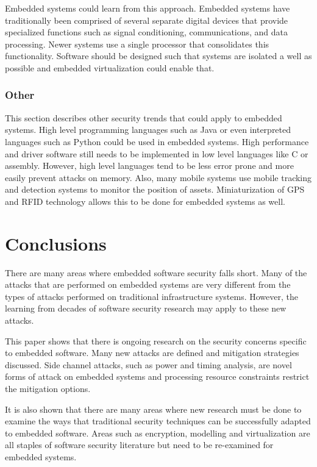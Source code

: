 \documentclass[final,conference,11pt]{IEEEtran}
\begin{document}
Embedded systems could learn from this approach.  Embedded systems have traditionally been comprised of several separate digital devices that provide specialized functions such as signal conditioning, communications, and data processing.  Newer systems use a single processor that consolidates this functionality.  Software should be designed such that systems are isolated a well as possible and embedded virtualization could enable that.  

\subsubsection{Other}
This section describes other security trends that could apply to embedded systems.  High level programming languages such as Java or even interpreted languages such as Python could be used in embedded systems.  High performance and driver software still needs to be implemented in low level languages like C or assembly. However, high level languages tend to be less error prone and more easily prevent attacks on memory.  Also, many mobile systems use mobile tracking and detection systems to monitor the position of assets.  Miniaturization of GPS and RFID technology allows this to be done for embedded systems as well. 

\section{Conclusions}

There are many areas where embedded software security falls short.  Many of the attacks that are performed on embedded systems are very different from the types of attacks performed on traditional infrastructure systems.  However, the learning from decades of software security research may apply to these new attacks.  

This paper shows that there is ongoing research on the security concerns specific to embedded software.  Many new attacks are defined and mitigation strategies discussed.  Side channel attacks, such as power and timing analysis, are novel forms of attack on embedded systems and processing resource constraints restrict the mitigation options. 

It is also shown that there are many areas where new research must be done to examine the ways that traditional security techniques can be successfully adapted to embedded software. Areas such as encryption, modelling and virtualization are all staples of software security literature but need to be re-examined for embedded systems.



\pagebreak
\end{document}
